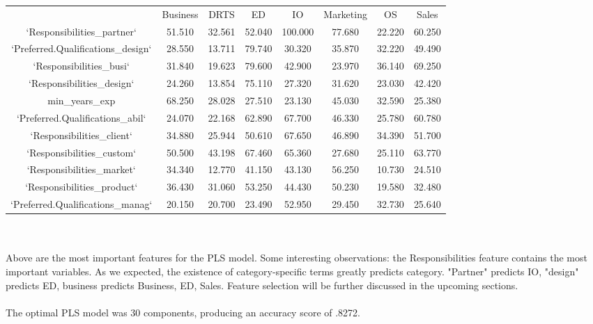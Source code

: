\documentclass[9.5 pt]{article}
\begin{document}
\begin{tabular}{||c c c c c c c c||} 
\hline
\rowcolor{orange} \multicolumn{8}{|l|}{PLS Feature Selection} \\
\hline
\rowcolor{gray}
\cellcolor[HTML]{266AFF} & Business & DRTS & ED & IO & Marketing & OS & Sales \\ \hline
\cellcolor[HTML]{266AFF} `Responsibilities\_partner` & 51.510 & 32.561 & 52.040 & 100.000 & 77.680 & 22.220 & 60.250 \\ \hline
\cellcolor[HTML]{266AFF} `Preferred.Qualifications\_design` & 28.550 & 13.711 & 79.740 & 30.320 & 35.870 & 32.220 & 49.490 \\ \hline
\cellcolor[HTML]{266AFF} `Responsibilities\_busi` & 31.840 & 19.623 & 79.600 & 42.900 & 23.970 & 36.140 & 69.250 \\ \hline
\cellcolor[HTML]{266AFF} `Responsibilities\_design` & 24.260 & 13.854 & 75.110 & 27.320 & 31.620 & 23.030 & 42.420 \\ \hline
\cellcolor[HTML]{266AFF} min\_years\_exp & 68.250 & 28.028 & 27.510 & 23.130 & 45.030 & 32.590 & 25.380 \\ \hline
\cellcolor[HTML]{266AFF} `Preferred.Qualifications\_abil` & 24.070 & 22.168 & 62.890 & 67.700 & 46.330 & 25.780 & 60.780 \\ \hline
\cellcolor[HTML]{266AFF} 
`Responsibilities\_client` & 34.880 & 25.944 & 50.610 & 67.650 & 46.890 & 34.390 & 51.700 \\ \hline
\cellcolor[HTML]{266AFF} 
`Responsibilities\_custom` & 50.500 & 43.198 & 67.460 & 65.360 & 27.680 & 25.110 & 63.770 \\ \hline
\cellcolor[HTML]{266AFF} 
`Responsibilities\_market` & 34.340 & 12.770 & 41.150 & 43.130 & 56.250 & 10.730 & 24.510 \\ \hline
\cellcolor[HTML]{266AFF} 
`Responsibilities\_product` & 36.430 & 31.060 & 53.250 & 44.430 & 50.230 & 19.580 & 32.480 \\ \hline
\cellcolor[HTML]{266AFF} 
`Preferred.Qualifications\_manag` & 20.150 & 20.700 & 23.490 & 52.950 & 29.450 & 32.730 & 25.640\\
\hline
\end{tabular}
\\\\Above are the most important features for the PLS model. Some interesting observations: the Responsibilities feature contains the most important variables. As we expected, the existence of category-specific terms greatly predicts category. "Partner" predicts IO, "design" predicts ED, business predicts Business, ED, Sales. Feature selection will be further discussed in the upcoming sections. \\ \\
The optimal PLS model was 30 components, producing an accuracy score of .8272.
\end{document}
